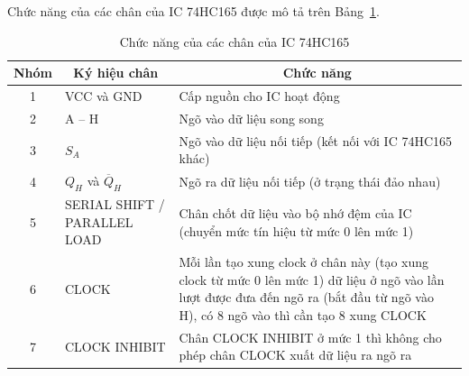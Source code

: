 \documentclass[12pt,a4paper]{article}
\newcommand{\tab}[1]{Bảng~#1}
\newcommand{\head}[1]{\textbf{#1}}
\begin{document}
    \newpage
    Chức năng của các chân của IC 74HC165 được mô tả trên \tab{\ref{Tab:Pin_Funtion}}.
        \begin{table}[htp]
            \centering
            \caption{Chức năng của các chân của IC 74HC165}
            \label{Tab:Pin_Funtion}
            \begin{tabular}{|c|m{4.5cm}|m{8.5cm}|}
                \hline
                \head{Nhóm} & \multicolumn{1}{c|}{\head{Ký hiệu chân}} & \multicolumn{1}{c|}{\head{Chức năng}} \\
                \hline
                1 & VCC và GND & Cấp nguồn cho IC hoạt động \\
                \hline
                2 & A -- H & Ngõ vào dữ liệu song song \\
                \hline
                3 & $S_A$ & Ngõ vào dữ liệu nối tiếp (kết nối với IC 74HC165 khác)\\
                \hline
                4 & $Q_H$ và $\overline{Q}_H$ & Ngõ ra dữ liệu nối tiếp (ở trạng thái đảo nhau) \\
                \hline
                5 & SERIAL SHIFT / PARALLEL LOAD &  Chân chốt dữ liệu vào bộ nhớ đệm của IC (chuyển mức tín hiệu từ mức 0 lên mức 1) \\
                \hline
                6 & CLOCK & Mỗi lần tạo xung clock ở chân này (tạo xung clock từ mức 0 lên mức 1) dữ liệu ở ngõ vào lần lượt được đưa đến ngõ ra (bắt đầu từ ngõ vào H), có 8 ngõ vào thì cần tạo 8 xung CLOCK\\
                \hline
                7 & CLOCK INHIBIT & Chân CLOCK INHIBIT ở mức 1 thì không cho phép chân CLOCK xuất dữ liệu ra ngõ ra\\
                \hline
            \end{tabular}
        \end{table}
\end{document}
